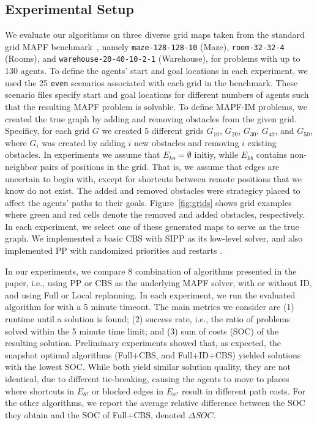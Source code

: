 \documentclass[letterpaper]{article} %
\def\
UrlFont{\rm}  %
\newcommand{\eko}{E_{ko}} %
\newcommand{\ekb}{E_{kb}} %
\newcommand{\eao}{E_{o?}} %
\newcommand{\eab}{E_{b?}} %
\theoremstyle{definition}
\begin{document}
\subsection{Experimental Setup}
We evaluate our algorithms on three diverse grid maps taken from the standard grid MAPF benchmark~\cite{stern2019multi}, namely \texttt{maze-128-128-10} (Maze),
\texttt{room-32-32-4} (Rooms), and
\texttt{warehouse-20-40-10-2-1} (Warehouse),
for problems with up to 130 agents.
To define the agents' start and goal locations in each experiment, we used the 25 \texttt{even} scenarios associated with each grid in the benchmark. These scenario files specify start and goal locations for different numbers of agents such that the resulting MAPF problem is solvable.
To define MAPF-IM problems, we created the true graph by adding and removing obstacles from the given grid.
Specificy, for each grid $G$ we created 5 different grids $G_{10}$,
$G_{20}$, $G_{30}$, $G_{40}$, and $G_{50}$, where $G_i$ was created by adding $i$ new obstacles and removing $i$ existing obstacles. In  experiments we assume that $\eko=\emptyset$ initiy, while $\ekb$ contains  non-neighbor pairs of positions in the grid. That is, we assume that  edges are uncertain to begin with, except for shortcuts between remote positions that we know do not exist.
The added and removed obstacles were strategicy placed to affect the agents' paths to their goals. Figure~\ref{fig:grids} shows grid examples where green and red cells denote the removed and added obstacles, respectively.
In each experiment, we select one of these generated maps to serve as the true graph. We implemented a basic CBS  \cite{sharon2015conflict} with SIPP \cite{phillips2011sipp} as its low-level solver, and also implemented PP with randomized priorities and restarts \cite{bennewitz2001optimizing}.

In our experiments, we compare  8 combination of algorithms presented in the paper, i.e., using PP or CBS as the underlying MAPF solver,
with or without ID, and using Full or Local replanning.
In each experiment, we run the evaluated algorithm for with a 5 minute timeout.
The main metrics we consider are (1) runtime until a solution is found;
(2) success rate, i.e., the ratio of problems solved within the 5 minute time limit; and (3) sum of costs (SOC) of the resulting solution.
Preliminary experiments showed that, as expected, the snapshot optimal algorithms (Full+CBS, and Full+ID+CBS) yielded solutions with the lowest SOC. While both yield similar solution quality, they are not identical, due to different tie-breaking, causing the agents to move to places where shortcuts in $\eab$ or blocked edges in $\eao$ result in different path costs.
For the other algorithms, we report the average relative difference between the SOC they obtain and the SOC of Full+CBS, denoted $\Delta SOC$.
\end{document}
